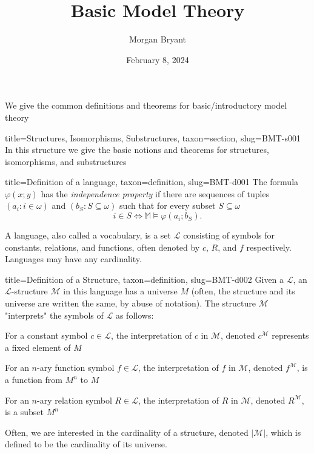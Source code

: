 \documentclass[a4paper]{article}
\title{Basic Model Theory}
\date{February 8, 2024}
\author{Morgan Bryant}
\begin{document}
\maketitle
\par{We give the common definitions and theorems for basic/introductory model theory}
\begin{tree}{title={Structures, Isomorphisms, Substructures}, taxon={section}, slug={BMT-s001}}
In this structure we give the basic notions and theorems for structures, isomorphisms, and substructures
\begin{tree}{title={Definition of a language}, taxon={definition}, slug={BMT-d001}}
The formula \(\varphi (x;y)\) has the \emph{independence property} if there
are sequences of tuples \((a_i : i  \in   \omega )\) and
\((b_S : S  \subseteq   \omega )\) such that for every subset \(S  \subseteq   \omega\)
\[i  \in  S  \Longleftrightarrow   \mathbb {M}  \models   \varphi (a_i; b_S).\]\par{A language, also called a vocabulary, is a set \(\mathcal {L}\) consisting of symbols for constants, relations, and functions, 
often denoted by \(c\), \(R\), and \(f\) respectively. Languages may have any cardinality.}
\end{tree}

\begin{tree}{title={Definition of a Structure}, taxon={definition}, slug={BMT-d002}}
Given a  \(\mathcal {L}\), an \(\mathcal {L}\)-structure \(\mathcal {M}\) in this language has a universe \(M\) (often, the structure and its universe 
are written the same, by abuse of notation). The structure \(\mathcal {M}\) "interprets" the symbols of \(\mathcal {L}\) as follows:\par{For a constant symbol \(c \in   \mathcal {L}\), the interpretation of \(c\) in \(\mathcal {M}\), denoted \(c^{ \mathcal {M}}\) represents a fixed 
element of \(M\)}\par{For an \(n\)-ary function symbol \(f \in   \mathcal {L}\), the interpretation of \(f\) in \(\mathcal {M}\), denoted \(f^{ \mathcal {M}}\),
is a function from \(M^n\) to \(M\)}\par{For an \(n\)-ary relation symbol \(R \in   \mathcal {L}\), the interpretation of \(R\) in \(\mathcal {M}\), denoted \(R^{ \mathcal {M}}\),
is a subset \(M^n\)}\par{Often, we are interested in the cardinality of a structure, denoted \(| \mathcal {M}|\), which is defined to be the cardinality of its universe.}
\end{tree}


\end{tree}
\end{document}
